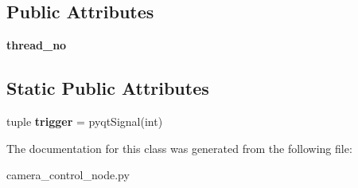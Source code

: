 \subsection*{Public Attributes}
\begin{DoxyCompactItemize}
\item 
\hypertarget{classcamera__control__node_1_1camera__qt__gui_1_1thread__timer_abcb046fcea265aff6535f08f15296066}{{\bfseries thread\-\_\-no}}\label{classcamera__control__node_1_1camera__qt__gui_1_1thread__timer_abcb046fcea265aff6535f08f15296066}

\end{DoxyCompactItemize}
\subsection*{Static Public Attributes}
\begin{DoxyCompactItemize}
\item 
\hypertarget{classcamera__control__node_1_1camera__qt__gui_1_1thread__timer_a16c447fa8f03c6b388f06a723f0e4159}{tuple {\bfseries trigger} = pyqt\-Signal(int)}\label{classcamera__control__node_1_1camera__qt__gui_1_1thread__timer_a16c447fa8f03c6b388f06a723f0e4159}

\end{DoxyCompactItemize}


The documentation for this class was generated from the following file\-:\begin{DoxyCompactItemize}
\item 
camera\-\_\-control\-\_\-node.\-py\end{DoxyCompactItemize}
